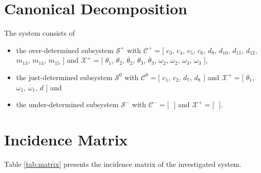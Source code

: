 \documentclass[a4,11pt]{article}
\begin{document}
\section{Canonical Decomposition}The system consists of
\begin{itemize}	\item the over-determined subsystem $\mathcal{S}^+$ with $\mathcal{C}^+ = [$ $c_3$, $c_4$, $c_5$, $c_6$, $d_9$, $d_{10}$, $d_{11}$, $d_{12}$, $m_{13}$, $m_{14}$, $m_{15} $ $]$ and $\mathcal{X}^+ = [$ $\theta_1$, $\theta_2$, $\dot{\theta_2}$, $\theta_3$, $\dot{\theta_3}$, $\omega_2$, $\dot{\omega_2}$, $\omega_3$, $\dot{\omega_3} $ $]$,
	\item the just-determined subsystem $\mathcal{S}^0$ with $\mathcal{C}^0 = [$ $c_1$, $c_2$, $d_7$, $d_8 $ $]$ and $\mathcal{X}^+ = [$ $\dot{\theta_1}$, $\omega_1$, $\dot{\omega_1}$, $d $ $]$ and
	\item the under-determined subsystem $\mathcal{S}^-$ with $\mathcal{C}^- = [$ $ $ $]$ and $\mathcal{X}^+ = [$ $ $ $]$.
\end{itemize}
\section{Incidence Matrix}
Table \ref{tab:matrix} presents the incidence matrix of the investigated system.\setlength\tabcolsep{2mm}
\end{document}

